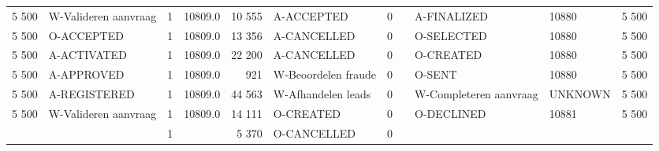 \begin{tabular}{rlrlrlrllll}
5 500 & W-Valideren aanvraag & 1 & 10809.0 & 10 555 & A-ACCEPTED & 0 &  & A-FINALIZED & 10880 & 5 500 \\
5 500 & O-ACCEPTED & 1 & 10809.0 & 13 356 & A-CANCELLED & 0 &  & O-SELECTED & 10880 & 5 500 \\
5 500 & A-ACTIVATED & 1 & 10809.0 & 22 200 & A-CANCELLED & 0 &  & O-CREATED & 10880 & 5 500 \\
5 500 & A-APPROVED & 1 & 10809.0 & 921 & W-Beoordelen fraude & 0 &  & O-SENT & 10880 & 5 500 \\
5 500 & A-REGISTERED & 1 & 10809.0 & 44 563 & W-Afhandelen leads & 0 &  & W-Completeren aanvraag & UNKNOWN & 5 500 \\
5 500 & W-Valideren aanvraag & 1 & 10809.0 & 14 111 & O-CREATED & 0 &  & O-DECLINED & 10881 & 5 500 \\
 &  & 1 &  & 5 370 & O-CANCELLED & 0 &  &  &  &  \\
\bottomrule
\end{tabular}
